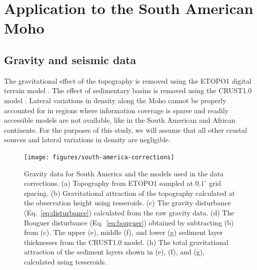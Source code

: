 \documentclass[extra]{gji}
\begin{document}
\section{Application to the South American Moho}


\subsection{Gravity and seismic data}

The gravitational effect of the topography
is removed using the
ETOPO1 digital terrain model
\citep[][ \url{http://dx.doi.org/10.7289/V5C8276M}]{amante2009}.
The effect of sedimentary basins is removed using the
CRUST1.0 model
\citep[][ \url{http://igppweb.ucsd.edu/~gabi/rem.html}]{laske2013}.
Lateral variations in density along the Moho cannot be properly accounted for
in regions where information coverage is sparse and readily accessible models
are not available, like in the South American and African continents.
For the purposes of this study, we will assume that all other crustal sources
and lateral variations in density are negligible.

\begin{figure}
    \centering
    \texttt{[image: figures/south-america-corrections]}
    \caption{
        Gravity data for South America and the models used in the data
        corrections.
        (a) Topography from ETOPO1 sampled at $0.1^\circ$ grid spacing.
        (b) Gravitational attraction of the topography calculated
        at the observation height using tesseroids.
        (c) The gravity disturbance (Eq.~\ref{eq:disturbance}) calculated from
        the raw gravity data.
        (d) The Bouguer disturbance (Eq.~\ref{eq:bouguer}) obtained by
        subtracting (b) from (c).
        The upper (e), middle (f), and lower (g) sediment layer thicknesses
        from the CRUST1.0 model.
        (h) The total gravitational attraction of the sediment layers shown in
        (e), (f), and (g), calculated using tesseroids.
        }
    \label{fig:sam-corrections}
\end{figure}
\end{document}
